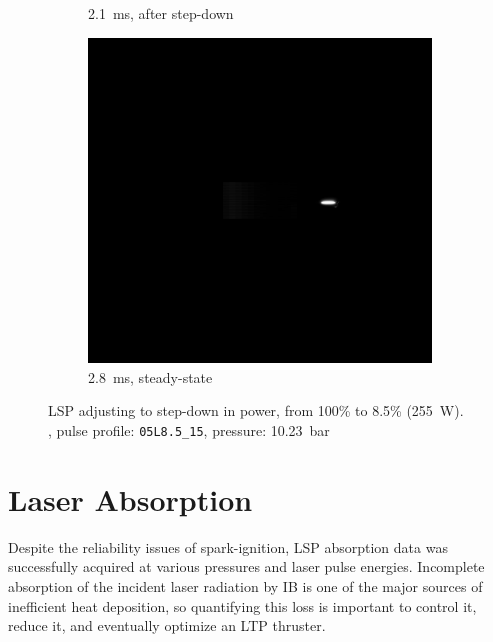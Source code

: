 \begin{figure}[h]
\begin{subfigure}[t]{0.32\textwidth}
                    \caption{\qty{2.1}{ms}, after step-down}
                    \label{fig:lsp_stepdown_21}
                \end{subfigure}
                \hfill
                \begin{subfigure}[t]{0.32\textwidth}
                    \centering
                    \includegraphics[trim=7.6in 5.3in 2.4in 5.5in, clip, width=\textwidth]{assets/5 results/LSP34_PS28/28.jpg}
                    \caption{\qty{2.8}{ms}, steady-state}
                    \label{fig:lsp_stepdown_28}
                \end{subfigure}
                \caption[LSP adjusting to step-down in power]{LSP adjusting to step-down in power, from 100\% to 8.5\% (\qty{255}{W}). , pulse profile: \texttt{05L8.5\_15}, pressure: \qty{10.23}{bar}}
                \label{fig:lsp_stepdown}
            \end{figure}

    \clearpage
    \section{Laser Absorption} \label{sec:exp_absorption}
        Despite the reliability issues of spark-ignition, LSP absorption data was successfully acquired at various pressures and laser pulse energies. Incomplete absorption of the incident laser radiation by IB is one of the major sources of inefficient heat deposition, so quantifying this loss is important to control it, reduce it, and  eventually optimize an LTP thruster.
        
